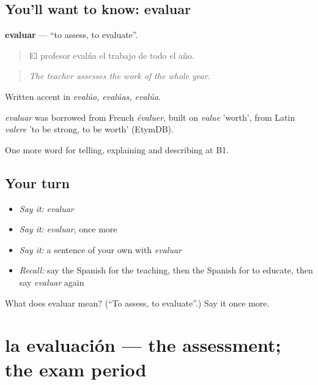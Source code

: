 \subsection*{You'll want to know: evaluar}
\textbf{evaluar} — \textquotedblleft{}to assess, to evaluate\textquotedblright{}.

\begin{quote}
El profesor evalúa el trabajo de todo el año.
\end{quote}

\begin{quote}
\emph{The teacher assesses the work of the whole year.}
\end{quote}

Written accent in \emph{evalúo, evalúas, evalúa}.

\begin{cousinweb}
\emph{evaluar} was borrowed from French \emph{évaluer}, built on \emph{value} 'worth', from Latin \emph{valere} 'to be strong, to be worth' (EtymDB).
\end{cousinweb}

\begin{grammarlens}[title={What you've built}]
One more word for telling, explaining and describing at B1.
\end{grammarlens}

\subsection*{Your turn}
\begin{itemize}
\raggedright
  \item \emph{Say it:} \emph{evaluar}
  \item \emph{Say it:} \emph{evaluar}, once more
  \item \emph{Say it:} a sentence of your own with \emph{evaluar}
  \item \emph{Recall:} say the Spanish for the teaching, then the Spanish for to educate, then say \emph{evaluar} again
\end{itemize}

\begin{tcolorbox}[breakable,colback=teal!4,colframe=teal!35!black,title={Before you move on}]
What does evaluar mean? (\textquotedblleft{}To assess, to evaluate\textquotedblright{}.) Say it once more.
\end{tcolorbox}
\section[la evaluación]{la evaluación — the assessment; the exam period}


